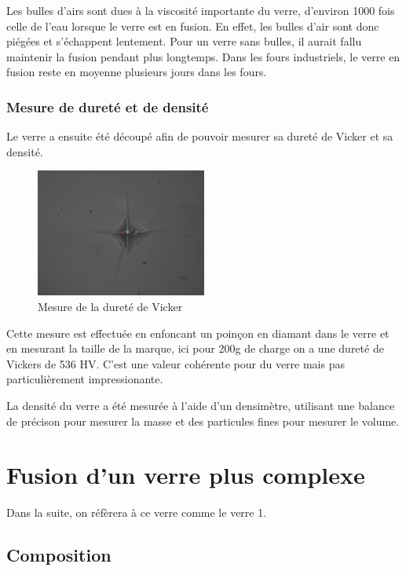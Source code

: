 \documentclass{article}
\begin{document}
Les bulles d'airs sont dues à la viscosité importante du verre, d'environ 1000 fois celle de l'eau lorsque le verre est en fusion. En effet, les bulles d'air sont donc piégées et s'échappent lentement. Pour un verre sans bulles, il aurait fallu maintenir la fusion pendant plus longtemps. Dans les fours industriels, le verre en fusion reste en moyenne plusieurs jours dans les fours.

\subsubsection{Mesure de dureté et de densité}

Le verre a ensuite été découpé afin de pouvoir mesurer sa dureté de Vicker et sa densité. 


\begin{figure}[h]
    \centering
    \includegraphics[width=0.5\textwidth]{photos/dureté.jpg}
    \caption{Mesure de la dureté de Vicker}
\end{figure}

Cette mesure est effectuée en enfoncant un poinçon en diamant dans le verre et en mesurant la taille de la marque, ici pour 200g de charge on a une dureté de Vickers de 536 HV. C'est une valeur cohérente pour du verre mais pas particulièrement impressionante.


La densité du verre a été mesurée à l'aide d'un densimètre, utilisant une balance de précison pour mesurer la masse et des particules fines pour mesurer le volume. 

\section{Fusion d'un verre plus complexe}
Dans la suite, on réfèrera à ce verre comme le verre 1.

\subsection{Composition}
\end{document}
